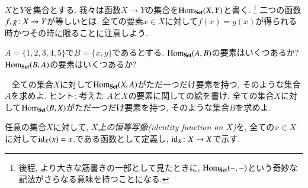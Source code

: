 $X$と$Y$を集合とする. 我々は函数$X\to Y$の集合を$\textrm{Hom}_{\bf Set}(X,Y)$と書く.
\footnote{後程, より大きな筋書きの一部として見たときに, $\textrm{Hom}_{\bf Set}(-,-)$という奇妙な記法がさらなる意味を持つことになる.}
二つの函数$f,g\colon X\rightarrow Y$が等しいとは, 全ての要素$x\in X$に対して$f(x)=g(x)$が得られる時かつその時に限ることに注意しよう.

\begin{exercise}
$A=\{1,2,3,4,5\}$で$B=\{x,y\}$であるとする.
\sexc $\textrm{Hom}_{\bf Set}(A,B)$の要素はいくつあるか?
\next $\textrm{Hom}_{\bf Set}(B,A)$の要素はいくつあるか?
\endsexc
\end{exercise}

\begin{exercise}~
\sexc 全ての集合$X$に対して$\textrm{Hom}_{\bf Set}(X,A)$がただ一つだけ要素を持つ, そのような集合$A$を求めよ. ヒント: 考えた $A$と$X$の要素に関しての絵を書け.
\next 全ての集合$X$に対して$\textrm{Hom}_{\bf Set}(B, X)$がただ一つだけ要素を持つ, そのような集合$B$を求めよ.
\endsexc
\end{exercise}


任意の集合$X$に対して, \emph{$X$上の恒等写像(identity function on $X$)}を, 全ての$x\in X$に対して$\textrm{id}_X(x)=x$.である函数として定義し, $\textrm{id}_X\colon X\rightarrow X$で示す.

